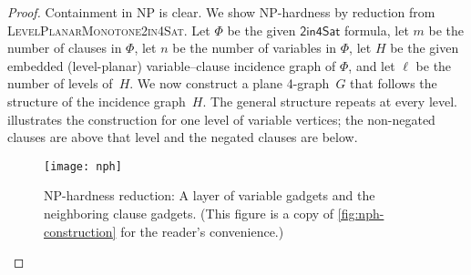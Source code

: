 \documentclass[runningheads]{llncs}
\begin{document}
\begin{proof}
    Containment in NP is clear.
    We show NP-hardness by reduction from \textsc{LevelPlanarMonotone2in4Sat}.
    Let $\Phi$ be the given $\mathsf{2in4Sat}$ formula,
    let $m$ be the number of clauses in $\Phi$,
    let $n$ be the number of variables in $\Phi$,
    let $H$ be the given embedded (level-planar)
    variable--clause incidence graph of $\Phi$,
    and let $\ell$ be the number of levels of~$H$.
    We now construct a plane 4-graph~$G$
    that follows the structure of the incidence graph~$H$.
    The general structure repeats at every level.
     illustrates the construction
    for one level of variable vertices; the non-negated clauses
    are above that level and the negated clauses are below.
    
    \begin{figure}[tbh]
        \centering
        \texttt{[image: nph]}
        \caption{NP-hardness reduction: A layer of variable gadgets and the neighboring clause gadgets.  (This figure is a copy of \cref{fig:nph-construction} for the reader's convenience.)}
        \label{fig:nph-construction-app}
    \end{figure}
    

\end{proof}
\end{document}
